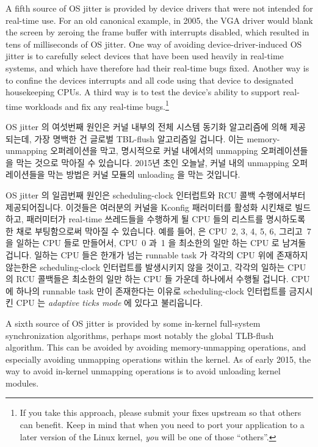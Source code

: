 A fifth source of OS jitter is provided by device drivers that were
not intended for real-time use.
For an old canonical example, in 2005, the VGA driver would blank
the screen by zeroing the frame buffer with interrupts disabled,
which resulted in tens of milliseconds of OS jitter.
One way of avoiding device-driver-induced OS jitter is to carefully
select devices that have been used heavily in real-time systems,
and which have therefore had their real-time bugs fixed.
Another way is to confine the devices interrupts and all code using
that device to designated housekeeping CPUs.
A third way is to test the device's ability to support real-time
workloads and fix any real-time bugs.\footnote{
	If you take this approach, please submit your fixes upstream
	so that others can benefit.
	Keep in mind that when you need to port your application to
	a later version of the Linux kernel, \emph{you} will be one of those
	``others''.}
\fi

OS jitter 의 여섯번째 원인은 커널 내부의 전체 시스템 동기화 알고리즘에 의해
제공되는데, 가장 명백한 건 글로벌 TBL-flush 알고리즘일 겁니다.
이는 memory-unmapping 오퍼레이션을 막고, 명시적으로 커널 내에서의 unmapping
오퍼레이션들을 막는 것으로 막아질 수 있습니다.
2015년 초인 오늘날, 커널 내의 unmapping 오퍼레이션들을 막는 방법은 커널 모듈의
unloading 을 막는 것입니다.

OS jitter 의 일곱번째 원인은 scheduling-clock 인터럽트와 RCU 콜백 수행에서부터
제공되어집니다.
이것들은 여러분의 커널을  Kconfig 패러미터를 활성화 시킨채로
빌드하고,  패러미터가 real-time 쓰레드들을 수행하게 될 CPU 들의
리스트를 명시하도록 한 채로 부팅함으로써 막아질 수 있습니다.
예를 들어,  은 CPU~2, 3, 4, 5, 6, 그리고~7 을 일하는 CPU 들로
만들어서, CPU~0 과~1 을 최소한의 일만 하는 CPU 로 남겨둘 겁니다.
일하는 CPU 들은 한개가 넘는 runnable task 가 각각의 CPU 위에 존재하지 않는한은
scheduling-clock 인터럽트를 발생시키지 않을 것이고, 각각의 일하는 CPU 의 RCU
콜백들은 최소한의 일만 하는 CPU 들 가운데 하나에서 수행될 겁니다.
CPU 에 하나의 runnable task 만이 존재한다는 이유로 scheduling-clock 인터럽트를
금지시킨 CPU 는 \emph{adaptive ticks mode} 에 있다고 불리웁니다.
\iffalse

A sixth source of OS jitter is provided by some in-kernel
full-system synchronization algorithms, perhaps most notably
the global TLB-flush algorithm.
This can be avoided by avoiding memory-unmapping operations, and especially
avoiding unmapping operations within the kernel.
As of early 2015, the way to avoid in-kernel
unmapping operations is to avoid unloading kernel modules.

